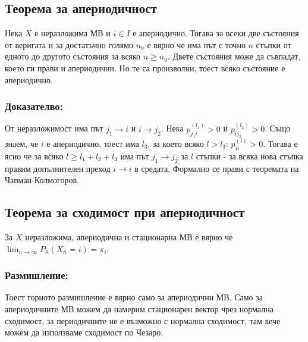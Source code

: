 \documentclass{article}
\begin{document}
\subsection{Теорема за апериодичност}
Нека $X$ е неразложима МВ и $i \in I$ е апериодично. Тогава за всеки две състояния от веригата и за достатъчно 
голямо $n_0$ е вярно че има път с точно $n$ стъпки от едното до другото състояния за всяко $n \geq n_0$. 
Двете състояния може да съвпадат, което ги прави и апериодични. Но те са произволни, тоест всяко състояние е апериодично.

\subsubsection*{Доказателво:}
От неразложимост има път $j_1 \to i$ и $i \to j_2$. Нека $p_{j_1i}^{(l_1)} > 0$ и $p_{ij_2}^{(l_2)} > 0$. Също знаем, че $i$ е апериодично, тоест 
има $l_3$, за което всяко $l > l_3$: $p_{ii}^{(l)} > 0$. Тогава е ясно че за всяко $l \geq l_1 + l_2 + l_3$ има път $j_1 \to j_2$ за $l$ стъпки - за всяка 
нова стъпка правим допълнителен преход $i \to i$ в средата. Формално се прави с теоремата на Чапман-Колмогоров.

\subsection{Теорема за сходимост при апериодичност}
За $X$ неразложима, апериодична и стационарна МВ е вярно че $\lim_{n\to\infty} P_\lambda(X_n = i) = \pi_i$.

\subsubsection*{Размишление:}
Тоест горното размишление е вярно само за апериодични МВ. Само за апериодичните МВ 
можем да намерим стационарен вектор чрез нормална сходимост, за периодичните не е възможно с нормална сходимост, 
там вече можем да използваме сходимост по Чезаро.
\end{document}
